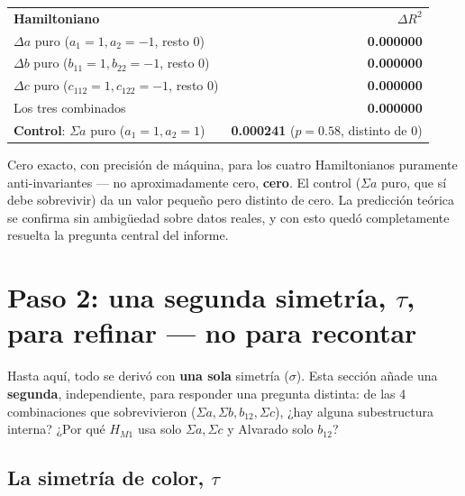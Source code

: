 \documentclass[11pt, a4paper]{article}
\newcommand{\TH}[1]{\cellcolor{cTHbg}\color{white}\textbf{#1}}
\newcommand{\good}[1]{\color{cGood}\textbf{#1}}
\newcommand{\bad}[1]{\color{cBad}\textbf{#1}}
\begin{document}
\medskip
\begin{center}
\begin{tabular}{lr}
  \TH{Hamiltoniano} & \TH{$\Delta R^2$} \\[1pt]
  $\Delta a$ puro ($a_1{=}1,a_2{=}{-}1$, resto 0)         & \bad{0.000000} \\
  $\Delta b$ puro ($b_{11}{=}1,b_{22}{=}{-}1$, resto 0)   & \bad{0.000000} \\
  $\Delta c$ puro ($c_{112}{=}1,c_{122}{=}{-}1$, resto 0) & \bad{0.000000} \\
  Los tres combinados                                      & \bad{0.000000} \\
  \good{Control}: $\Sigma a$ puro ($a_1{=}1,a_2{=}1$)      & \good{0.000241} ($p=0.58$, distinto de 0) \\
\end{tabular}
\end{center}
\medskip

\begin{tcolorbox}[quotebox]
  Cero exacto, con precisi\'on de m\'aquina, para los cuatro
  Hamiltonianos puramente anti-invariantes --- no aproximadamente
  cero, \textbf{cero}. El control ($\Sigma a$ puro, que s\'i debe
  sobrevivir) da un valor peque\~no pero distinto de cero. La
  predicci\'on te\'orica se confirma sin ambig\"uedad sobre datos
  reales, y con esto qued\'o completamente resuelta la pregunta
  central del informe.
\end{tcolorbox}

\section{Paso 2: una segunda simetr\'ia, $\tau$, para refinar --- no para recontar}
\label{sec:tau}

Hasta aqu\'i, todo se deriv\'o con \textbf{una sola} simetr\'ia
($\sigma$). Esta secci\'on a\~nade una \textbf{segunda}, independiente,
para responder una pregunta distinta: de las 4 combinaciones que
sobrevivieron ($\Sigma a,\Sigma b,b_{12},\Sigma c$), ¿hay alguna
subestructura interna? ¿Por qu\'e $H_{M1}$ usa solo $\Sigma a,\Sigma c$
y Alvarado solo $b_{12}$?

\subsection{La simetr\'ia de color, $\tau$}
\end{document}
